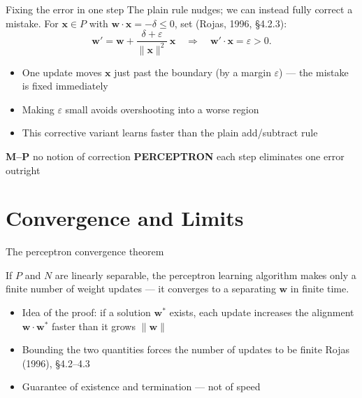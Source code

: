 \documentclass[aspectratio=169, 11pt]{beamer}
\newcommand{\mppar}[2]{%
  \vfill
  {\footnotesize
  \begin{tcolorbox}[enhanced, sidebyside, sidebyside align=top,
                    lefthand ratio=0.485,
                    segmentation style={mpc!35, line width=0.6pt},
                    colback=mpc!5, colframe=mpc!35, boxrule=0.5pt,
                    arc=1.5mm, left=2mm, right=2mm, top=0.8mm, bottom=0.8mm]
    {\color{mpc}\textbf{M--P}}\;\; #1
  \tcblower
    {\color{pcc}\textbf{PERCEPTRON}}\;\; #2
  \end{tcolorbox}}%
  \vspace{0.6em}%
}
\begin{document}
\begin{frame}{Fixing the error in one step}
  The plain rule nudges; we can instead \alert{fully correct}
  a mistake. For $\mathbf{x}\in P$ with
  $\mathbf{w}\!\cdot\!\mathbf{x} = -\delta \le 0$, set
  (Rojas, 1996, \S4.2.3):
  \[
    \mathbf{w}' = \mathbf{w}
    + \frac{\delta + \varepsilon}{\lVert\mathbf{x}\rVert^2}\,
    \mathbf{x}
    \quad\Rightarrow\quad
    \mathbf{w}'\!\cdot\!\mathbf{x} = \varepsilon > 0.
  \]
  \begin{itemize}\setlength{\itemsep}{1pt}
    \item One update moves $\mathbf{x}$ just past the boundary
          (by a margin $\varepsilon$) --- the mistake is
          \alert{fixed immediately}
    \item Making $\varepsilon$ small avoids overshooting into
          a worse region
    \item This \alert{corrective} variant learns faster than
          the plain add/subtract rule
  \end{itemize}
  \mppar{no notion of correction}
        {each step \alert{eliminates} one error outright}
\end{frame}

\section{Convergence and Limits}

\begin{frame}{The perceptron convergence theorem}
  \begin{redhighlight}
    If $P$ and $N$ are \alert{linearly separable}, the
    perceptron learning algorithm makes only a
    \alert{finite} number of weight updates --- it converges
    to a separating $\mathbf{w}$ in finite time.
  \end{redhighlight}
  \vspace{0.4em}
  \begin{itemize}\setlength{\itemsep}{2pt}
    \item Idea of the proof: if a solution
          $\mathbf{w}^{*}$ exists, each update increases the
          alignment $\mathbf{w}\!\cdot\!\mathbf{w}^{*}$ faster
          than it grows $\lVert\mathbf{w}\rVert$
    \item Bounding the two quantities forces the number of
          updates to be finite
          \hfill{\scriptsize Rojas (1996), \S4.2--4.3}
    \item Guarantee of \alert{existence and termination} ---
          not of speed
  \end{itemize}
\end{frame}
\end{document}
